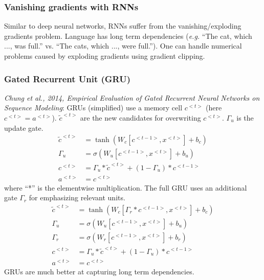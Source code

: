 \documentclass{article}
\begin{document}
\subsubsection{Vanishing gradients with RNNs}
Similar to deep neural networks, RNNs suffer from the vanishing/exploding gradients problem.
Language has long term dependencies (\emph{e.g.} ``The cat, which ..., was full.'' vs. ``The cats, which ..., were full.'').
One can handle numerical problems caused by exploding gradients using gradient clipping.

\subsubsection{Gated Recurrent Unit (GRU)}
\emph{Chung et al., 2014, Empirical Evaluation of Gated Recurrent Neural Networks on Sequence Modeling}:
GRUs (simplified) use a memory cell $c^{<t>}$ (here $c^{<t>}=a^{<t>}$).
$\tilde{c}^{<t>}$ are the new candidates for overwriting $c^{<t>}$.
$\Gamma_u$ is the update gate.
\begin{equation}
  \begin{split}
    \tilde{c}^{<t>}&=\tanh(W_c[c^{<t-1>},x^{<t>}]+b_c)\\
    \Gamma_u&=\sigma(W_u[c^{<t-1>},x^{<t>}]+b_u)\\
    c^{<t>}&=\Gamma_u*\tilde{c}^{<t>}+(1-\Gamma_u)*c^{<t-1>}\\
    a^{<t>}&=c^{<t>}
  \end{split}
\end{equation}
where ``*'' is the elementwise multiplication.
The full GRU uses an additional gate $\Gamma_r$ for emphasizing relevant units.
\begin{equation}
  \begin{split}
    \tilde{c}^{<t>}&=\tanh(W_c[\Gamma_r*c^{<t-1>},x^{<t>}]+b_c)\\
    \Gamma_u&=\sigma(W_u[c^{<t-1>},x^{<t>}]+b_u)\\
    \Gamma_r&=\sigma(W_r[c^{<t-1>},x^{<t>}]+b_r)\\
    c^{<t>}&=\Gamma_u*\tilde{c}^{<t>}+(1-\Gamma_u)*c^{<t-1>}\\
    a^{<t>}&=c^{<t>}
  \end{split}
\end{equation}
GRUs are much better at capturing long term dependencies.
\end{document}
